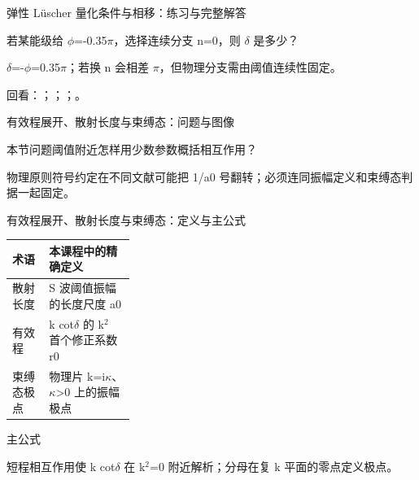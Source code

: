 \begin{frame}[t]{弹性 Lüscher 量化条件与相移：练习与完整解答}
\footnotesize
\begin{block}{}若某能级给 \ensuremath{\phi}=-0.35\ensuremath{\pi}，选择连续分支 n=0，则 \ensuremath{\delta} 是多少？\end{block}
\begin{exampleblock}{}\ensuremath{\delta}=-\ensuremath{\phi}=0.35\ensuremath{\pi}；若换 n 会相差 \ensuremath{\pi}，但物理分支需由阈值连续性固定。\end{exampleblock}
\vfill
\scriptsize 回看：；；；。
\end{frame}

\begin{frame}[t]{有效程展开、散射长度与束缚态：问题与图像}
\footnotesize
\begin{block}{本节问题}阈值附近怎样用少数参数概括相互作用？\end{block}
\begin{block}{物理原则}\quad 符号约定在不同文献可能把 1/\allowbreak{}a0 号翻转；必须连同振幅定义和束缚态判据一起固定。\end{block}
\end{frame}

\begin{frame}[t]{有效程展开、散射长度与束缚态：定义与主公式}
\footnotesize\begin{tabularx}{\linewidth}{p{0.30\linewidth}Y}
\toprule 术语 & 本课程中的精确定义\\\midrule
{} 散射长度 & S 波阈值振幅的长度尺度 a0\\
 有效程 & k cot\ensuremath{\delta} 的 k\ensuremath{^{2}} 首个修正系数 r0\\
 束缚态极点 & 物理片 k=i\ensuremath{\kappa}、\ensuremath{\kappa}>0 上的振幅极点\\
\bottomrule\end{tabularx}\vspace{0.15cm}
\begin{block}{ 主公式}\centering{}\end{block}
短程相互作用使 k cot\ensuremath{\delta} 在 k\ensuremath{^{2}}=0 附近解析；分母在复 k 平面的零点定义极点。
\end{frame}


